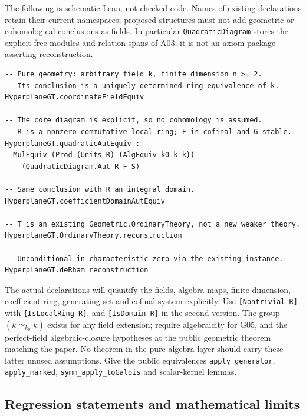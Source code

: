 \documentclass[11pt]{article}
\theoremstyle{remark}\newtheorem{remark}[theorem]{Remark}
\newcommand{\code}[1]{\nolinkurl{#1}}
\begin{document}
The following is schematic Lean, not checked code. Names of
existing declarations retain their current namespaces; proposed
structures must not add geometric or cohomological conclusions
as fields. In particular \code{QuadraticDiagram} stores the
explicit free modules and relation spans of A03; it is not an
axiom package asserting reconstruction.
\par\smallskip
\noindent\begin{minipage}{\linewidth}
\begin{lstlisting}
-- Pure geometry: arbitrary field k, finite dimension n >= 2.
-- Its conclusion is a uniquely determined ring equivalence of k.
HyperplaneGT.coordinateFieldEquiv

-- The core diagram is explicit, so no cohomology is assumed.
-- R is a nonzero commutative local ring; F is cofinal and G-stable.
HyperplaneGT.quadraticAutEquiv :
  MulEquiv (Prod (Units R) (AlgEquiv k0 k k))
    (QuadraticDiagram.Aut R F S)

-- Same conclusion with R an integral domain.
HyperplaneGT.coefficientDomainAutEquiv

-- T is an existing Geometric.OrdinaryTheory, not a new weaker theory.
HyperplaneGT.OrdinaryTheory.reconstruction

-- Unconditional in characteristic zero via the existing instance.
HyperplaneGT.deRham_reconstruction
\end{lstlisting}
\end{minipage}
\par\smallskip
The actual declarations will quantify the fields, algebra maps,
finite dimension, coefficient ring, generating set and cofinal
system explicitly. Use \texttt{[Nontrivial R]} with
\texttt{[IsLocalRing R]}, and \texttt{[IsDomain R]} in the second
version. The group $(k\simeq_{k_0}k)$ exists for any field
extension; require algebraicity for G05, and the perfect-field
algebraic-closure hypotheses at the public geometric theorem
matching the paper. No theorem in the pure algebra layer should
carry these latter unused assumptions. Give the public
equivalences \code{apply_generator}, \code{apply_marked},
\code{symm_apply_toGalois} and scalar-kernel lemmas.

\subsection{Regression statements and mathematical limits}
\end{document}
